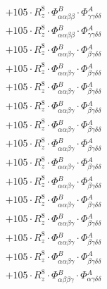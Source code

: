 \documentclass{article}
\begin{document}
\begin{subequations}
\begin{gather}
\begin{array}{c}
 \\[0.2em] 		 + 105 \cdot R_{z}^{8} \cdot \Phi{}^{B}_{\alpha{}\alpha{}\beta{}\beta{}} \cdot \Phi{}^{A}_{\gamma{}\gamma{}\delta{}\delta{}} 
 \\[0.2em] 		 + 105 \cdot R_{z}^{8} \cdot \Phi{}^{B}_{\alpha{}\alpha{}\beta{}\beta{}} \cdot \Phi{}^{A}_{\gamma{}\gamma{}\delta{}\delta{}} 
 \\[0.2em] 		 + 105 \cdot R_{z}^{8} \cdot \Phi{}^{B}_{\alpha{}\alpha{}\beta{}\gamma{}} \cdot \Phi{}^{A}_{\beta{}\gamma{}\delta{}\delta{}} 
 \\[0.2em] 		 + 105 \cdot R_{z}^{8} \cdot \Phi{}^{B}_{\alpha{}\alpha{}\beta{}\gamma{}} \cdot \Phi{}^{A}_{\beta{}\gamma{}\delta{}\delta{}} 
 \\[0.2em] 		 + 105 \cdot R_{z}^{8} \cdot \Phi{}^{B}_{\alpha{}\alpha{}\beta{}\gamma{}} \cdot \Phi{}^{A}_{\beta{}\gamma{}\delta{}\delta{}} 
 \\[0.2em] 		 + 105 \cdot R_{z}^{8} \cdot \Phi{}^{B}_{\alpha{}\alpha{}\beta{}\gamma{}} \cdot \Phi{}^{A}_{\beta{}\gamma{}\delta{}\delta{}} 
 \\[0.2em] 		 + 105 \cdot R_{z}^{8} \cdot \Phi{}^{B}_{\alpha{}\alpha{}\beta{}\gamma{}} \cdot \Phi{}^{A}_{\beta{}\gamma{}\delta{}\delta{}} 
 \\[0.2em] 		 + 105 \cdot R_{z}^{8} \cdot \Phi{}^{B}_{\alpha{}\alpha{}\beta{}\gamma{}} \cdot \Phi{}^{A}_{\beta{}\gamma{}\delta{}\delta{}} 
 \\[0.2em] 		 + 105 \cdot R_{z}^{8} \cdot \Phi{}^{B}_{\alpha{}\alpha{}\beta{}\gamma{}} \cdot \Phi{}^{A}_{\beta{}\gamma{}\delta{}\delta{}} 
 \\[0.2em] 		 + 105 \cdot R_{z}^{8} \cdot \Phi{}^{B}_{\alpha{}\alpha{}\beta{}\gamma{}} \cdot \Phi{}^{A}_{\beta{}\gamma{}\delta{}\delta{}} 
 \\[0.2em] 		 + 105 \cdot R_{z}^{8} \cdot \Phi{}^{B}_{\alpha{}\alpha{}\beta{}\gamma{}} \cdot \Phi{}^{A}_{\beta{}\gamma{}\delta{}\delta{}} 
 \\[0.2em] 		 + 105 \cdot R_{z}^{8} \cdot \Phi{}^{B}_{\alpha{}\alpha{}\beta{}\gamma{}} \cdot \Phi{}^{A}_{\beta{}\gamma{}\delta{}\delta{}} 
 \\[0.2em] 		 + 105 \cdot R_{z}^{8} \cdot \Phi{}^{B}_{\alpha{}\alpha{}\beta{}\gamma{}} \cdot \Phi{}^{A}_{\beta{}\gamma{}\delta{}\delta{}} 
 \\[0.2em] 		 + 105 \cdot R_{z}^{8} \cdot \Phi{}^{B}_{\alpha{}\alpha{}\beta{}\gamma{}} \cdot \Phi{}^{A}_{\beta{}\gamma{}\delta{}\delta{}} 
 \\[0.2em] 		 + 105 \cdot R_{z}^{8} \cdot \Phi{}^{B}_{\alpha{}\beta{}\beta{}\gamma{}} \cdot \Phi{}^{A}_{\alpha{}\gamma{}\delta{}\delta{}} 

\end{array}
\end{gather}
\end{subequations}
\end{document}
